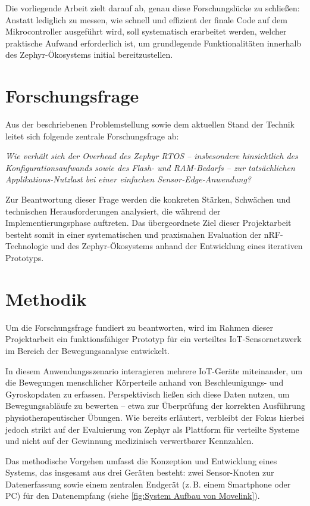 Die vorliegende Arbeit zielt darauf ab, genau diese Forschungslücke zu schließen: Anstatt lediglich zu messen, wie schnell und effizient der finale Code auf dem Mikrocontroller ausgeführt wird, soll systematisch erarbeitet werden, welcher praktische Aufwand erforderlich ist, um grundlegende Funktionalitäten innerhalb des Zephyr-Ökosystems initial bereitzustellen.

\section{Forschungsfrage}
\label{sec:Forschungsfrage}
Aus der beschriebenen Problemstellung sowie dem aktuellen Stand der Technik leitet sich folgende zentrale Forschungsfrage ab:

\textit{Wie verhält sich der Overhead des Zephyr RTOS – insbesondere hinsichtlich des Konfigurationsaufwands sowie des Flash- und RAM-Bedarfs – zur tatsächlichen Applikations-Nutzlast bei einer einfachen Sensor-Edge-Anwendung?}

Zur Beantwortung dieser Frage werden die konkreten Stärken, Schwächen und technischen Herausforderungen analysiert, die während der Implementierungsphase auftreten. Das übergeordnete Ziel dieser Projektarbeit besteht somit in einer systematischen und praxisnahen Evaluation der nRF-Technologie und des Zephyr-Ökosystems anhand der Entwicklung eines iterativen Prototyps.

\section{Methodik}
Um die Forschungsfrage fundiert zu beantworten, wird im Rahmen dieser Projektarbeit ein funktionsfähiger Prototyp für ein verteiltes IoT-Sensornetzwerk im Bereich der Bewegungsanalyse entwickelt.

In diesem Anwendungsszenario interagieren mehrere IoT-Geräte miteinander, um die Bewegungen menschlicher Körperteile anhand von Beschleunigungs- und Gyroskopdaten zu erfassen. Perspektivisch ließen sich diese Daten nutzen, um Bewegungsabläufe zu bewerten – etwa zur Überprüfung der korrekten Ausführung physiotherapeutischer Übungen. Wie bereits erläutert, verbleibt der Fokus hierbei jedoch strikt auf der Evaluierung von Zephyr als Plattform für verteilte Systeme und nicht auf der Gewinnung medizinisch verwertbarer Kennzahlen.

Das methodische Vorgehen umfasst die Konzeption und Entwicklung eines Systems, das insgesamt aus drei Geräten besteht: zwei Sensor-Knoten zur Datenerfassung sowie einem zentralen Endgerät (z.\,B. einem Smartphone oder PC) für den Datenempfang (siehe \autoref{fig:System Aufbau von Movelink}).

